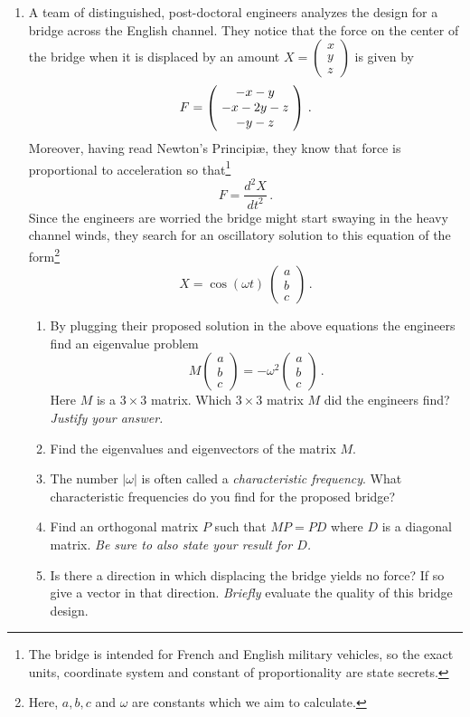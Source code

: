 \begin{enumerate}
\item
A team of distinguished, post-doctoral engineers analyzes the design for a bridge across the
English channel. They notice that the force on the center of the bridge when it is displaced
by an amount $X=\begin{pmatrix}x\\y\\z\end{pmatrix}$ is given by 
$$
F=\left(\!\begin{array}{c} -x-y\\-x-2y-z\\-y-z \end{array}\!\right)\, .
$$
Moreover, having read Newton's Principi\ae{}, they know that force is proportional to acceleration so that\footnote{The bridge is intended for French and English military vehicles, so the exact units, coordinate system and constant of proportionality are state secrets.}
$$
F=\frac{d^2 X}{dt^2}\, .
$$
Since the engineers are worried the bridge might start swaying in the heavy channel winds, they search for 
an oscillatory  solution to this equation of the form\footnote{Here, $a,b,c$ and $\omega$ are constants which we aim to calculate.}
$$
X=\cos(\omega t) \ \begin{pmatrix} a \\ b \\ c\end{pmatrix}\, .
$$
\begin{enumerate}
\item By plugging their proposed solution in the above equations the engineers find an eigenvalue problem
$$
M \begin{pmatrix} a \\ b \\ c\end{pmatrix} = -\omega^2 \begin{pmatrix} a \\ b \\ c\end{pmatrix}\, .
$$
Here $M$ is a $3\times 3$ matrix. Which $3\times 3$ matrix  $M$ did the engineers find?
{\it Justify your answer.}
\item
Find the eigenvalues and eigenvectors of the matrix $M$.
\item The number $|\omega|$ is often called a {\it characteristic frequency}. What characteristic
frequencies do you find for the proposed bridge?
\item Find an orthogonal matrix $P$ such that $MP=PD$ where $D$ is a diagonal matrix.
{\it Be sure to also state your result for $D$.}
\item Is there a direction in which displacing the bridge yields no force? If so give a vector in that direction.
{\it Briefly} evaluate the quality of this bridge design.
\end{enumerate}



\end{enumerate}
